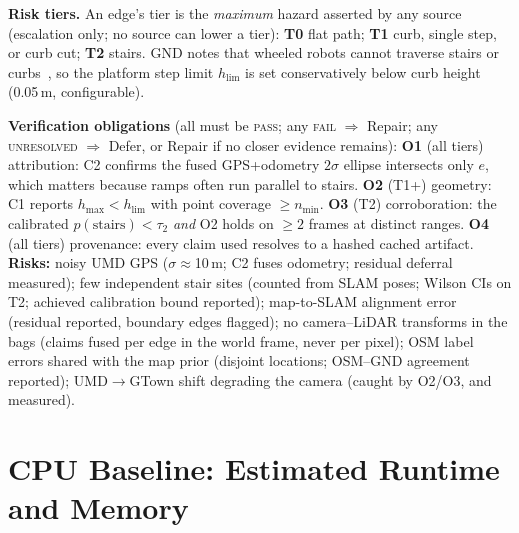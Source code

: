 \documentclass[10pt,letterpaper]{article}
\begin{document}
\textbf{Risk tiers.} An edge's tier is the \emph{maximum} hazard asserted by any source (escalation
only; no source can lower a tier): \textbf{T0} flat path; \textbf{T1} curb, single step, or curb cut;
\textbf{T2} stairs. GND notes that wheeled robots cannot traverse stairs or curbs~\cite{gnd}, so the
platform step limit $h_{\text{lim}}$ is set conservatively below curb height (0.05\,m, configurable).

\textbf{Verification obligations} (all must be \textsc{pass}; any \textsc{fail} $\Rightarrow$
Repair; any \textsc{unresolved} $\Rightarrow$ Defer, or Repair if no closer evidence remains):
\textbf{O1} (all tiers) attribution: C2 confirms the fused GPS+odometry $2\sigma$ ellipse intersects only
$e$, which matters because ramps often run parallel to stairs. \textbf{O2} (T1+) geometry: C1 reports
$h_{\max} < h_{\text{lim}}$ with point coverage $\ge n_{\min}$. \textbf{O3} (T2) corroboration: the
calibrated $p(\text{stairs}) < \tau_2$ \emph{and} O2 holds on $\ge 2$ frames at distinct ranges.
\textbf{O4} (all tiers) provenance: every claim used resolves to a hashed cached artifact.
\textbf{Risks:} noisy UMD GPS ($\sigma\approx$10\,m; C2 fuses odometry; residual deferral measured); few independent stair sites (counted from SLAM poses; Wilson CIs on T2; achieved calibration bound reported); map-to-SLAM alignment error (residual reported, boundary edges flagged);
no camera--LiDAR transforms in the bags (claims fused per edge in the world frame, never per pixel);
OSM label errors shared with the map prior (disjoint locations; OSM--GND agreement reported);
UMD$\to$GTown shift degrading the camera (caught by O2/O3, and measured).

\section{CPU Baseline: Estimated Runtime and Memory}
\end{document}
